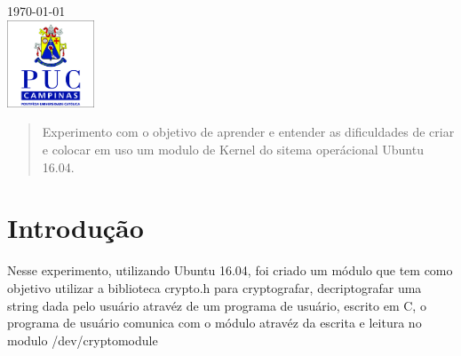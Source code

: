 \begin{titlepage}


{\large \today}\\[2cm] %


\includegraphics[width=26mm]{logo.jpg}%
 

\vfill %

\end{titlepage}


\begin{abstract}
Experimento com o objetivo de aprender e entender as dificuldades de criar e colocar em uso um modulo de Kernel do sitema operácional Ubuntu 16.04.
\end{abstract}

\section{Introdução}

Nesse experimento, utilizando Ubuntu 16.04, foi criado um módulo que tem como objetivo utilizar a biblioteca crypto.h para cryptografar, decriptografar uma string dada pelo usuário atravéz de um programa de usuário, escrito em C, o programa de usuário comunica com o módulo atravéz da escrita e leitura no modulo /dev/cryptomodule 

